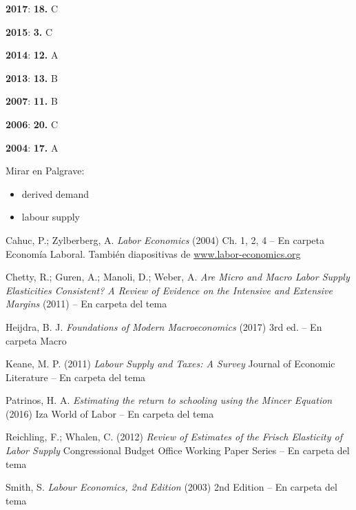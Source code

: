 \documentclass{nuevotema}
\begin{document}
\notas



\textbf{2017}: \textbf{18.} C

\textbf{2015}: \textbf{3.} C

\textbf{2014}: \textbf{12.} A

\textbf{2013}: \textbf{13.} B

\textbf{2007}: \textbf{11.} B

\textbf{2006}: \textbf{20.} C 

\textbf{2004}: \textbf{17.} A

\bibliografia

Mirar en Palgrave:
\begin{itemize}
	\item derived demand
	\item labour supply
\end{itemize}

Cahuc, P.; Zylberberg, A. \textit{Labor Economics} (2004) Ch. 1, 2, 4 -- En carpeta Economía Laboral. También diapositivas de \url{www.labor-economics.org}

Chetty, R.; Guren, A.; Manoli, D.; Weber, A. \textit{Are Micro and Macro Labor Supply Elasticities Consistent? A Review of Evidence on the Intensive and Extensive Margins} (2011) -- En carpeta del tema

Heijdra, B. J. \textit{Foundations of Modern Macroeconomics} (2017) 3rd ed. -- En carpeta Macro

Keane, M. P. (2011) \textit{Labour Supply and Taxes: A Survey} Journal of Economic Literature -- En carpeta del tema

Patrinos, H. A. \textit{Estimating the return to schooling using the Mincer Equation} (2016) Iza World of Labor -- En carpeta del tema

Reichling, F.; Whalen, C. (2012) \textit{Review of Estimates of the Frisch Elasticity of Labor Supply} Congressional Budget Office Working Paper Series -- En carpeta del tema

Smith, S. \textit{Labour Economics, 2nd Edition} (2003) 2nd Edition -- En carpeta del tema
\end{document}
